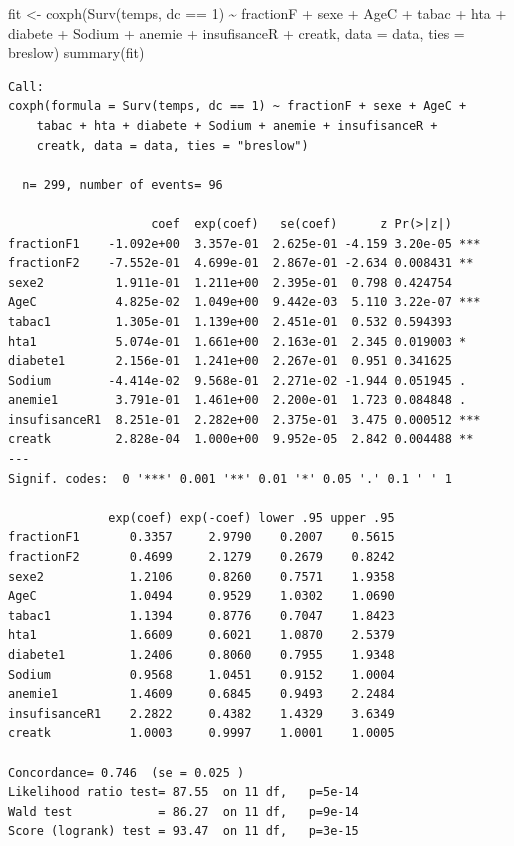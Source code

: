 \documentclass[
  letterpaper,
  DIV=11,
  numbers=noendperiod]{scrartcl}
\newenvironment{Shaded}{\begin{snugshade}}{\end{snugshade}}
\newcommand{\AttributeTok}[1]{\textcolor[rgb]{0.40,0.45,0.13}{#1}}
\newcommand{\DecValTok}[1]{\textcolor[rgb]{0.68,0.00,0.00}{#1}}
\newcommand{\FunctionTok}[1]{\textcolor[rgb]{0.28,0.35,0.67}{#1}}
\newcommand{\NormalTok}[1]{\textcolor[rgb]{0.00,0.23,0.31}{#1}}
\newcommand{\OtherTok}[1]{\textcolor[rgb]{0.00,0.23,0.31}{#1}}
\newcommand{\SpecialCharTok}[1]{\textcolor[rgb]{0.37,0.37,0.37}{#1}}
\newcommand{\StringTok}[1]{\textcolor[rgb]{0.13,0.47,0.30}{#1}}
\begin{document}
\begin{Shaded}
\begin{Highlighting}[]
\NormalTok{fit }\OtherTok{\textless{}{-}} \FunctionTok{coxph}\NormalTok{(}\FunctionTok{Surv}\NormalTok{(temps, dc }\SpecialCharTok{==} \DecValTok{1}\NormalTok{) }\SpecialCharTok{\textasciitilde{}}\NormalTok{ fractionF }\SpecialCharTok{+}\NormalTok{ sexe }\SpecialCharTok{+}\NormalTok{ AgeC }\SpecialCharTok{+}\NormalTok{ tabac }\SpecialCharTok{+}\NormalTok{ hta }\SpecialCharTok{+}\NormalTok{ diabete }\SpecialCharTok{+}\NormalTok{ Sodium }\SpecialCharTok{+}\NormalTok{ anemie }\SpecialCharTok{+}\NormalTok{ insufisanceR }\SpecialCharTok{+}\NormalTok{ creatk, }
             \AttributeTok{data =}\NormalTok{ data, }\AttributeTok{ties =} \StringTok{\textquotesingle{}breslow\textquotesingle{}}\NormalTok{)}
\FunctionTok{summary}\NormalTok{(fit)}
\end{Highlighting}
\end{Shaded}

\begin{verbatim}
Call:
coxph(formula = Surv(temps, dc == 1) ~ fractionF + sexe + AgeC + 
    tabac + hta + diabete + Sodium + anemie + insufisanceR + 
    creatk, data = data, ties = "breslow")

  n= 299, number of events= 96 

                    coef  exp(coef)   se(coef)      z Pr(>|z|)    
fractionF1    -1.092e+00  3.357e-01  2.625e-01 -4.159 3.20e-05 ***
fractionF2    -7.552e-01  4.699e-01  2.867e-01 -2.634 0.008431 ** 
sexe2          1.911e-01  1.211e+00  2.395e-01  0.798 0.424754    
AgeC           4.825e-02  1.049e+00  9.442e-03  5.110 3.22e-07 ***
tabac1         1.305e-01  1.139e+00  2.451e-01  0.532 0.594393    
hta1           5.074e-01  1.661e+00  2.163e-01  2.345 0.019003 *  
diabete1       2.156e-01  1.241e+00  2.267e-01  0.951 0.341625    
Sodium        -4.414e-02  9.568e-01  2.271e-02 -1.944 0.051945 .  
anemie1        3.791e-01  1.461e+00  2.200e-01  1.723 0.084848 .  
insufisanceR1  8.251e-01  2.282e+00  2.375e-01  3.475 0.000512 ***
creatk         2.828e-04  1.000e+00  9.952e-05  2.842 0.004488 ** 
---
Signif. codes:  0 '***' 0.001 '**' 0.01 '*' 0.05 '.' 0.1 ' ' 1

              exp(coef) exp(-coef) lower .95 upper .95
fractionF1       0.3357     2.9790    0.2007    0.5615
fractionF2       0.4699     2.1279    0.2679    0.8242
sexe2            1.2106     0.8260    0.7571    1.9358
AgeC             1.0494     0.9529    1.0302    1.0690
tabac1           1.1394     0.8776    0.7047    1.8423
hta1             1.6609     0.6021    1.0870    2.5379
diabete1         1.2406     0.8060    0.7955    1.9348
Sodium           0.9568     1.0451    0.9152    1.0004
anemie1          1.4609     0.6845    0.9493    2.2484
insufisanceR1    2.2822     0.4382    1.4329    3.6349
creatk           1.0003     0.9997    1.0001    1.0005

Concordance= 0.746  (se = 0.025 )
Likelihood ratio test= 87.55  on 11 df,   p=5e-14
Wald test            = 86.27  on 11 df,   p=9e-14
Score (logrank) test = 93.47  on 11 df,   p=3e-15
\end{verbatim}
\end{document}
